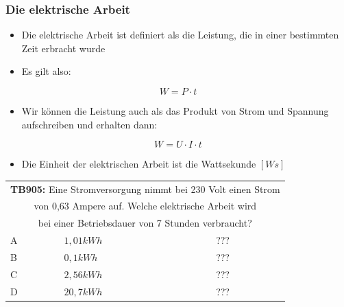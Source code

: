 \begin{frame}
	\frametitle{Die elektrische Arbeit}
	\begin{itemize}
		\item	Die elektrische Arbeit ist definiert als die Leistung, die in einer bestimmten Zeit erbracht wurde
		\item	Es gilt also:
	\end{itemize}
	\begin{equation}
		W = P \cdot t
	\end{equation}
	\begin{itemize}
		\item	Wir können die Leistung auch als das Produkt von Strom und Spannung aufschreiben und erhalten dann:
	\end{itemize}
	\begin{equation}
		W = U \cdot I \cdot t
	\end{equation}
	\begin{itemize}
		\item	Die Einheit der elektrischen Arbeit ist die Wattsekunde $[Ws]$
	\end{itemize}
\end{frame}

\begin{frame}
	\begin{small}	
	\begin{tabular}{|l|l|l|}
	\hline
		\multicolumn{3}{|c|}{\textbf{TB905:} Eine Stromversorgung nimmt bei 230 Volt einen Strom }\\
		\multicolumn{3}{|c|}{von 0,63 Ampere auf. Welche elektrische Arbeit  wird }\\
		\multicolumn{3}{|c|}{bei einer Betriebsdauer von 7 Stunden verbraucht?}\\
		\hline
		A & $1,01 kWh$ & ??? \\ \hline
		B & $0,1 kWh $ & ??? \\ \hline
		C & $2,56 kWh$ & ??? \\ \hline
		D & $20,7 kWh$ & ??? \\ \hline	
	\end{tabular}
	\end{small}
\end{frame}

